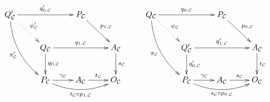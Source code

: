 \documentclass[a4paper,UKenglish,cleveref,pdftex,thm-restate,numberwithinsect]{lipics-v2021}
\begin{document}
\begin{definition}
\begin{enumerate}
		\[\xymatrix{Q'_{\mathcal{C}} \ar@/_.4cm/[ddr]_{\pi'_{\mathcal{C}}} \ar@{.>}[dr]^{\psi'_{\mathcal{C}}}\ar[rr]^{q'_{0, \mathcal{C}}}&&P_{\mathcal{C}} \ar[dr]^{p_{1, \mathcal{C}}}&&Q_\mathcal{C} \ar[rr]^{q_{0, \mathcal{C}}} \ar@/_.4cm/[ddr]_{\pi_{\mathcal{C}}} \ar@{.>}[dr]^{\psi_{\mathcal{C}}}&&P_{\mathcal{C}} \ar[dr]^{p_{0, \mathcal{C}}}\\ & Q_{\mathcal{C}} \ar[rr]^{q_{1, \mathcal{C}}} \ar[d]^{q_{0, \mathcal{C}}} & & A_{\mathcal{C}} \ar[d]^{s_{\mathcal{C}}}&  & Q_{\mathcal{C}}' \ar[rr]^{q'_{1, \mathcal{C}}} \ar[d]^{q'_{0, \mathcal{C}}} &&  A_{\mathcal{C}} \ar[d]^{t_{\mathcal{C}}}\\ &P_{\mathcal{C}} \ar@/_.4cm/[rr]_{t_{\mathcal{C}}\circ p_{1, \mathcal{C}}}  \ar[r]^{\gamma_{\mathcal{C}}} & A_{\mathcal{C}} \ar[r]^{t_{\mathcal{C}}} & O_{\mathcal{C}} &  & P_{\mathcal{C}} \ar@/_.4cm/[rr]_{s_{\mathcal{C}}\circ p_{0, \mathcal{C}}}\ar[r]^{\gamma_{\mathcal{C}}}& A_{\mathcal{C}} \ar[r]^{s_{\mathcal{C}}} & O_{\mathcal{C}}}\]
	\iffalse 
	Moreover, the outer boundaries of the following diagrams are pullbacks and so are the inner right squares. Thus the inner left squares are pullbacks too. 
	
	\[\xymatrix{Q_{\mathcal{C}}\ar[r]_{\theta_{\mathcal{C}}} \ar[d]_{q_{0, \mathcal{C}}} \ar@/^.4cm/[rr]^{q_{1, \mathcal{C}}}& P_{\mathcal{C}} \ar[r]_{p_{1, \mathcal{C}}} \ar[d]_{p_{0, \mathcal{C}}}  & A_{\mathcal{C}} \ar[d]^{s_{\mathcal{C}}}& Q_{\mathcal{C}}'\ar[r]_{\theta_{\mathcal{C}}'} \ar[d]_{q'_{0, \mathcal{C}}} \ar@/^.4cm/[rr]^{q'_{1, \mathcal{C}}} & P_{\mathcal{C}} \ar[r]_{p_{0, \mathcal{C}}} \ar[d]_{p_{1, \mathcal{C}}} & A_{\mathcal{C}} \ar[d]^{t_{\mathcal{C}}}\\ P_{\mathcal{C}} \ar@/_.4cm/[rr]_{t_{\mathcal{C}} \circ p_{1, \mathcal{C}}} \ar[r]^{\gamma_{\mathcal{C}}} & A_{\mathcal{C}} \ar[r]^{t_{\mathcal{C}}} & O_{\mathcal{C}} & P_{\mathcal{C}} \ar@/_.4cm/[rr]_{s_{\mathcal{C}} \circ p_{0, \mathcal{C}}} \ar[r]^{\gamma_{\mathcal{C}}} & A_{\mathcal{C}} \ar[r]^{s_{\mathcal{C}}} & O_{\mathcal{C}}}\]
	
	In particular, this entails the existence of morphisms $\psi_{\mathcal{C}}\colon Q_{\mathcal{C}} \to Q_{\mathcal{C}}'$ and $\psi'_{\mathcal{C}}\colon Q'_\mathcal{C}\to Q_{\mathcal{C}}$ fitting in the diagrams below.
	
		\[\xymatrix{Q_{\mathcal{C}} \ar@/^.4cm/[drr]^{\theta_{\mathcal{C}}} \ar@/_.4cm/[ddr]_{q_{0, \mathcal{C}}} \ar@{.>}[dr]^{\psi_{\mathcal{C}}} &&&Q_{\mathcal{C}}' \ar@/^.4cm/[drr]^{\theta_{\mathcal{C}}'} \ar@{.>}[dr]^{\psi_{\mathcal{C}}'} \ar@/_.4cm/[ddr]_{q'_{0, \mathcal{C}}}\\&Q_{\mathcal{C}}' \ar[r]^{\theta_{\mathcal{C}}'} \ar[d]_{q'_{0, \mathcal{C}}} &P_{\mathcal{C}} \ar[d]^{p_{1, \mathcal{C}}} &  &Q_{\mathcal{C}} \ar[r]^{\theta_{\mathcal{C}}} \ar[d]_{q_{0, \mathcal{C}}} &P_{\mathcal{C}} \ar[d]^{p_{1, \mathcal{C}}}\\ & P_{\mathcal{C}} \ar[r]_{\gamma_{\mathcal{C}}}  &A_{\mathcal{C}} & &P_{\mathcal{C}} \ar[r]_{\gamma_{\mathcal{C}}}  &A_{\mathcal{C}}}\]
	\fi 
	

\end{enumerate}
\end{definition}
\end{document}
